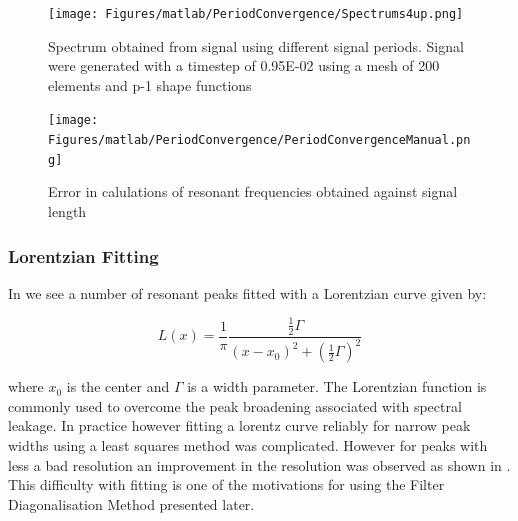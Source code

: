 


\begin{figure}
\texttt{[image: Figures/matlab/PeriodConvergence/Spectrums4up.png]}
\caption{Spectrum obtained from signal using different signal periods. Signal were generated with a timestep of 0.95E-02 using a mesh of 200 elements and p-1 shape functions}
\label{Period1}
\end{figure}

\begin{figure}
\texttt{[image: Figures/matlab/PeriodConvergence/PeriodConvergenceManual.png]}
\caption{Error in calulations of resonant frequencies obtained against signal length}
\label{Period2}
\end{figure}


\subsubsection{Lorentzian Fitting}

In  we see a number of resonant peaks fitted with a Lorentzian curve given by:

$$
L(x)=\frac{1}{\pi} \frac{\frac{1}{2}\Gamma}{ (x-x_0)^2 + (\frac{1}{2}\Gamma)^2}
$$

where $x_0$ is the center and $\Gamma$ is a width parameter. The Lorentzian function is commonly used to overcome the peak broadening associated with spectral leakage. In practice however fitting a lorentz curve reliably for narrow peak widths using a least squares method was complicated. However for peaks with less a bad resolution an improvement in the resolution was observed as shown in . This difficulty with fitting is one of the motivations for using the Filter Diagonalisation Method presented later.

